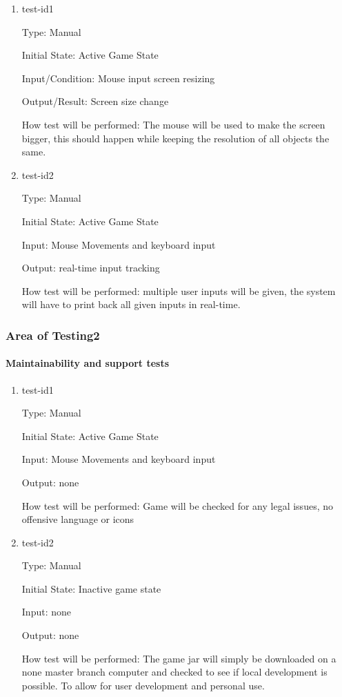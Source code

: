\documentclass[12pt, titlepage]{article}
\begin{document}
\begin{enumerate}

\item{test-id1\\}

Type: Manual
					
Initial State: Active Game State
		
Input/Condition: Mouse input screen resizing
					
Output/Result: Screen size change
					
How test will be performed: The mouse will be used to make the screen bigger, this should happen while keeping the resolution of all objects the same. 
					
\item{test-id2\\}

Type: Manual
					
Initial State: Active Game State
					
Input: Mouse Movements and keyboard input
					
Output: real-time input tracking 
					
How test will be performed: multiple user inputs will be given, the system will have to print back all given inputs in real-time. 

\end{enumerate}

\subsubsection{Area of Testing2}

\paragraph{Maintainability and support tests}

\begin{enumerate}

\item{test-id1\\}

Type: Manual
					
Initial State: Active Game State
					
Input: Mouse Movements and keyboard input
					
Output: none
					
How test will be performed: Game will be checked for any legal issues, no offensive language or icons 

\item{test-id2\\}

Type: Manual
					
Initial State: Inactive game state
					
Input: none
					
Output: none
					
How test will be performed: The game jar will simply be downloaded on a none master branch computer and checked to see if local development is possible. To allow for user development and personal use. 


\end{enumerate}
\end{document}
